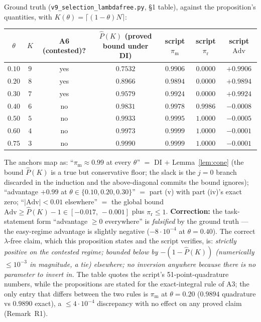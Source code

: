 \begin{remark}
Ground truth (\texttt{v9\_selection\_lambdafree.py}, \S 1 table), against the proposition's quantities, with $K(\theta) = \lceil (1-\theta) N \rceil$:

\begin{center}
\begin{tabular}{ccccccc}
\hline
$\theta$ & $K$ & A6 (contested)? & $\widehat P(K)$ (proved bound under DI) & script $\pi_{\mathrm{m}}$ & script $\pi_{\mathrm{r}}$ & script $\mathrm{Adv}$ \\
\hline
$0.10$ & $9$ & yes & $0.7532$ & $0.9906$ & $0.0000$ & $+0.9906$ \\
$0.20$ & $8$ & yes & $0.8966$ & $0.9894$ & $0.0000$ & $+0.9894$ \\
$0.30$ & $7$ & yes & $0.9579$ & $0.9924$ & $0.0000$ & $+0.9924$ \\
$0.40$ & $6$ & no  & $0.9831$ & $0.9978$ & $0.9986$ & $-0.0008$ \\
$0.50$ & $5$ & no  & $0.9933$ & $0.9995$ & $1.0000$ & $-0.0005$ \\
$0.60$ & $4$ & no  & $0.9973$ & $0.9999$ & $1.0000$ & $-0.0001$ \\
$0.75$ & $3$ & no  & $0.9990$ & $0.9999$ & $1.0000$ & $-0.0001$ \\
\hline
\end{tabular}
\end{center}

The anchors map as: ``$\pi_{\mathrm{m}} \approx 0.99$ at every $\theta$'' $=$ DI $+$ Lemma~\ref{lem:cone} (the bound $\widehat P(K)$ is a true but conservative floor; the slack is the $j = 0$ branch discarded in the induction and the above-diagonal commits the bound ignores); ``advantage $+0.99$ at $\theta \in \{0.10, 0.20, 0.30\}$'' $=$ part (v) with part (iv)'s exact zero; ``$|\mathrm{Adv}| < 0.01$ elsewhere'' $=$ the global bound $\mathrm{Adv} \ge \widehat P(K) - 1 \in [-0.017,\, -0.001]$ plus $\pi_{\mathrm{r}} \le 1$. \textbf{Correction:} the task-statement form ``advantage $\ge 0$ everywhere'' is \emph{falsified} by the ground truth --- the easy-regime advantage is slightly negative ($-8 \cdot 10^{-4}$ at $\theta = 0.40$). The correct $\lambda$-free claim, which this proposition states and the script verifies, is: \emph{strictly positive on the contested regime; bounded below by $-(1 - \widehat P(K))$ (numerically $\le 10^{-3}$ in magnitude, a tie) elsewhere; no inversion anywhere because there is no parameter to invert in.} The table quotes the script's 51-point-quadrature numbers, while the propositions are stated for the exact-integral rule of A3; the only entry that differs between the two rules is $\pi_{\mathrm{m}}$ at $\theta = 0.20$ ($0.9894$ quadrature vs $0.9890$ exact), a $\le 4 \cdot 10^{-4}$ discrepancy with no effect on any proved claim (Remark~R1).
\end{remark}

